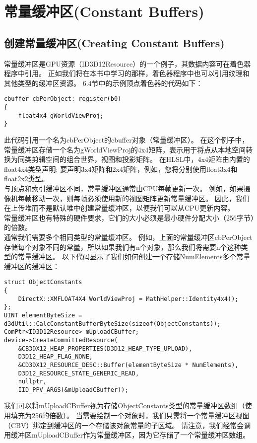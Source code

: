 \section{常量缓冲区(Constant Buffers)}
\subsection{创建常量缓冲区(Creating Constant Buffers)}
\begin{flushleft}
常量缓冲区是GPU资源（ID3D12Resource）的一个例子，其数据内容可在着色器程序中引用。 正如我们将在本书中学习的那样，着色器程序中也可以引用纹理和其他类型的缓冲区资源。 6.4节中的示例顶点着色器的代码如下：
\begin{lstlisting}
cbuffer cbPerObject: register(b0)
{
    float4x4 gWorldViewProj;
}
\end{lstlisting}
此代码引用一个名为cbPerObject的cbuffer对象（常量缓冲区）。 在这个例子中，常量缓冲区存储一个名为gWorldViewProj的4x4矩阵，表示用于将点从本地空间转换为同类剪辑空间的组合世界，视图和投影矩阵。 在HLSL中，4x4矩阵由内置的float4x4类型声明; 要声明3x4矩阵和2x4矩阵，例如，您将分别使用float3x4和float2x2类型。\\
与顶点和索引缓冲区不同，常量缓冲区通常由CPU每帧更新一次。 例如，如果摄像机每帧移动一次，则每帧必须使用新的视图矩阵更新常量缓冲区。 因此，我们在上传堆而不是默认堆中创建常量缓冲区，以便我们可以从CPU更新内容。\\
常量缓冲区也有特殊的硬件要求，它们的大小必须是最小硬件分配大小（256字节）的倍数。\\
通常我们需要多个相同类型的常量缓冲区。 例如，上面的常量缓冲区cbPerObject存储每个对象不同的常量，所以如果我们有n个对象，那么我们将需要n个这种类型的常量缓冲区。 以下代码显示了我们如何创建一个存储NumElements多个常量缓冲区的缓冲区：
\begin{lstlisting}
struct ObjectConstants
{
    DirectX::XMFLOAT4X4 WorldViewProj = MathHelper::Identity4x4();
};
UINT elementByteSize = d3dUtil::CalcConstantBufferByteSize(sizeof(ObjectConstants));
ComPtr<ID3D12Resource> mUploadCBuffer;
device->CreateCommittedResource(
    &CB3DX12_HEAP_PROPERTIES(D3D12_HEAP_TYPE_UPLOAD), 
    D3D12_HEAP_FLAG_NONE, 
    &CD3DX12_RESOURCE_DESC::Buffer(elementByteSize * NumElements),
    D3D12_RESOURCE_STATE_GENERIC_READ,
    nullptr, 
    IID_PPV_ARGS(&mUploadCBuffer));
\end{lstlisting}
我们可以将mUploadCBuffer视为存储ObjectConstants类型的常量缓冲区数组（使用填充为256的倍数）。 当需要绘制一个对象时，我们只需将一个常量缓冲区视图（CBV）绑定到缓冲区的一个存储该对象常量的子区域。 请注意，我们经常会调用缓冲区mUploadCBuffer作为常量缓冲区，因为它存储了一个常量缓冲区数组。\\

\end{flushleft}
